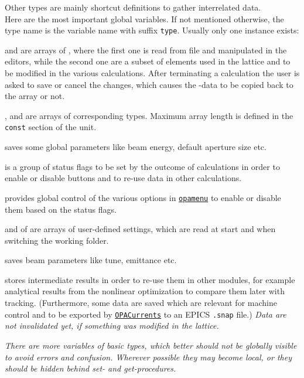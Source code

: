 \documentclass[12pt]{article}
\newcommand\code[1]{{\tt #1}}
\newcommand{\unico}[1]{{\color{burntorange}\code{#1}}}
\newcommand{\opagui}[1]{\colorbox{blue!20}{\code{#1}}}
\newcommand{\ogui}[1]{\hyperref[#1]{\opagui{#1}}}
\newcommand{\todo}[1]{{\color{red}\em #1}}
\begin{document}
{Other types are mainly shortcut definitions to gather interrelated data.\\

Here are the most important global variables. If not mentioned otherwise, the type name is the variable name with suffix \code{type}. Usually only one instance exists:

\unico{Elem} and \unico{Ella} are arrays of \unico{Elementtype}, where the first one is read from file and manipulated in the editors, while the second one are a subset of elements used in the lattice and to be modified in the various calculations. After terminating a calculation the user is asked to save or cancel the changes, which causes the \unico{Ella}-data to be copied back to the \unico{Elem} array or not.

\unico{Segm}, \unico{Lattice} and \unico{Girder} are arrays of corresponding types. Maximum array length is defined in the \code{const} section of the unit.

\unico{Glob} saves some global parameters like beam energy, default aperture size etc.

\unico{Status} is a group of status flags to be set by the outcome of calculations in order to enable or disable buttons and to re-use data in other calculations.

\unico{MainButtonHandles} provides global control of the various options in \ogui{opamenu} to enable or disable them based on the status flags.

\unico{GlobDef} and \unico{Def} of \unico{DefaultType} are arrays of user-defined settings, which are read at start and when switching the working folder. 

\unico{Beam} saves beam parameters like tune, emittance etc.

\unico{SnapSave} stores intermediate results in order to re-use them in other modules, for example analytical results from the nonlinear optimization to compare them later with tracking. (Furthermore, some data are saved which are relevant for machine control and to be exported by \ogui{OPACurrents} to an EPICS \code{.snap} file.) \todo{Data are not invalidated yet, if something was modified in the lattice.}

\todo{There are more variables of basic types, which better should not be globally visible to avoid errors and confusion. Wherever possible they may become local, or they should be hidden behind set- and get-procedures.}

}
\end{document}
